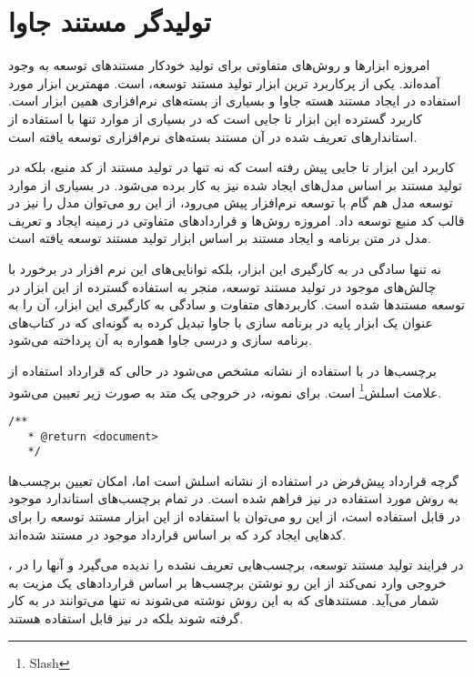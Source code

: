  
\section{تولیدگر مستند جاوا}
امروزه ابزارها و روش‌های متفاوتی برای تولید خودکار مستندهای توسعه به وجود آمده‌اند. یکی از پرکاربرد ترین ابزار تولید مستند توسعه،  است\cite{javadocsun}. مهمترین ابزار مورد استفاده در ایجاد مستند هسته جاوا و بسیاری از بسته‌های 
نرم‌افزاری همین ابزار است. کاربرد گسترده این ابزار تا جایی است که در بسیاری از موارد تنها با استفاده از استاندارهای تعریف شده
در آن مستند بسته‌های نرم‌افزاری توسعه یافته است.

کاربرد این ابزار تا جایی پیش رفته است که نه تنها در تولید مستند از کد منبع، بلکه در تولید مستند بر اساس مدل‌های ایجاد شده
نیز به کار برده می‌شود. در بسیاری از موارد توسعه مدل هم گام با توسعه نرم‌افزار پیش می‌رود، از این رو می‌توان مدل را نیز در 
قالب کد منبع توسعه داد. امروزه روش‌ها و قراردادهای متفاوتی در زمینه ایجاد و تعریف مدل در متن برنامه و ایجاد مستند بر
اساس ابزار تولید مستند  توسعه یافته است\cite{Kramer:1999:ADS:318372.318577}.

نه تنها سادگی در به کارگیری این ابزار، بلکه توانایی‌های این نرم افزار در برخورد با چالش‌های موجود در تولید مستند توسعه، منجر به استفاده گسترده از این ابزار در توسعه مستند‌ها شده است\cite{Leslie:2002:UJX:584955.584971}. کاربردهای متفاوت و
سادگی به کارگیری این ابزار، آن را به عنوان یک ابزار پایه در برنامه سازی با جاوا تبدیل کرده به گونه‌ای که در کتاب‌های برنامه سازی
و درسی جاوا همواره به آن پرداخته می‌شود\cite{Schildt:2000:JCR:557816}.

برچسب‌ها در  با استفاده از نشانه  مشخص می‌شود در حالی که قرارداد  
استفاده از علامت اسلش\footnote{Slash} است. برای نمونه، در  خروجی یک متد به صورت زیر تعیین
می‌شود.
\begin{latin}
\lstset{language=C++}  
\begin{lstlisting}[frame=single]
  /**
   * @return <document>
   */
\end{lstlisting}
\end{latin}
گرچه قرارداد پیش‌فرض در  استفاده از نشانه اسلش است اما،  امکان تعیین برچسب‌ها به روش
مورد استفاده در  نیز فراهم شده است. در  تمام برچسب‌های استاندارد
موجود در  قابل استفاده است، از این رو می‌توان با استفاده از این ابزار مستند توسعه را برای کدهایی ایجاد
کرد که بر اساس قرارداد موجود در  مستند شده‌اند.

، در فرایند تولید مستند توسعه، برچسب‌هایی تعریف نشده را ندیده می‌گیرد و آنها را در خروجی وارد نمی‌کند از این
رو  نوشتن برچسب‌ها بر اساس قراردادهای  یک مزیت به شمار می‌آید. مستند‌های که به این روش نوشته می‌شوند نه
تنها می‌توانند در  به کار گرفته شوند بلکه در  نیز قابل استفاده هستند.